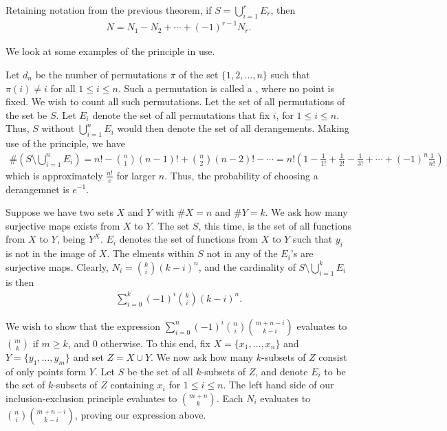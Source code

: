 \begin{corollary}
    Retaining notation from the previous theorem, if $S = \bigcup_{i=1}^{r} E_{r}$, then
    \begin{align}
        N = N_{1} - N_{2} + \cdots + (-1)^{r-1} N_{r}.
    \end{align}
\end{corollary}

We look at some examples of the principle in use.
\begin{example}
    Let $d_{n}$ be the number of permutations $\pi$ of the set $\{1,2,\ldots,n\}$ such that $\pi(i) \neq i$ for all $1 \leq i \leq n$. Such a permutation is called a , where no point is fixed. We wish to count all such permutations. Let the set of all permutations of the set be $S$. Let $E_{i}$ denote the set of all permutations that fix $i$, for $1 \leq i \leq n$. Thus, $S$ without $\bigcup_{i=1}^{n} E_{i}$ would then denote the set of all derangements. Making use of the principle, we have
    \begin{align}
        \#(S \setminus \bigcup_{i=1}^{n} E_{i}) = n! - \binom{n}{1}(n-1)! + \binom{n}{2} (n-2)! - \cdots = n! \left( 1-\frac{1}{1!} + \frac{1}{2!} - \frac{1}{3!} + \cdots + (-1)^{n} \frac{1}{n!} \right)
    \end{align}
    which is approximately $\frac{n!}{e}$ for larger $n$. Thus, the probability of choosing a derangemnet is $e^{-1}$.
\end{example}

\begin{example}
    Suppose we have two sets $X$ and $Y$ with $\# X = n$ and $\# Y = k$. We ask how many surjective maps exists from $X$ to $Y$. The set $S$, this time, is the set of all functions from $X$ to $Y$, being $Y^{X}$. $E_{i}$ denotes the set of functions from $X$ to $Y$ such that $y_{i}$ is not in the image of $X$. The elments within $S$ not in any of the $E_{i}$'s are surjective maps. Clearly, $N_{i} = \binom{k}{i} (k-i)^{n}$, and the cardinality of $S \setminus \bigcup_{i=1}^{k} E_{i}$ is then
    \begin{align}
        \sum_{i=0}^{k} (-1)^{i} \binom{k}{i} (k-i)^{n}.
    \end{align}
\end{example}

\begin{example}
    We wish to show that the expression $\sum_{i=0}^{n} (-1)^{i} \binom{n}{i} \binom{m+n-i}{k-i}$ evaluates to $\binom{m}{k}$ if $m \geq k$, and $0$ otherwise. To this end, fix $X = \{x_{1},\ldots,x_{n}\}$ and $Y = \{y_{1},\ldots,y_{m}\}$ and set $Z = X \cup Y$. We now ask how many $k$-subsets of $Z$ consist of only points form $Y$. Let $S$ be the set of all $k$-subsets of $Z$, and denote $E_{i}$ to be the set of $k$-subsets of $Z$ containing $x_{i}$ for $1 \leq i \leq n$. The left hand side of our inclusion-exclusion principle evaluates to $\binom{m+n}{k}$. Each $N_{i}$ evaluates to $\binom{n}{i} \binom{m+n-i}{k-i}$, proving our expression above.
\end{example}

